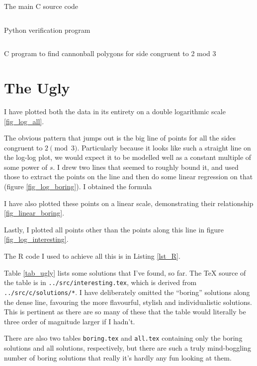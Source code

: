 \begin{longlisting}
\inputminted{c}{../src/c/cannonball.c}
\caption{The main C source code}
\label{lst_c}
\end{longlisting}

\begin{longlisting}
\inputminted{python}{../src/factcheck.py}
\caption{Python verification program}
\label{lst_py_verif}
\end{longlisting}

\begin{longlisting}
\inputminted{c}{../src/c/2mod3/2mod3.c}
\caption{C program to find cannonball polygons for side congruent to 2 mod 3}
\label{lst_c_2mod3}
\end{longlisting}

\section{The Ugly}

I have plotted both the data in its entirety on a double logarithmic scale
\ref{fig_log_all}.

The obvious pattern that jumps out is the big line of points for all the sides
congruent to \(2 \pmod 3\). Particularly because it looks like such a straight
line on the log-log plot, we would expect it to be modelled well as a constant
multiple of some power of \(s\). I drew two lines that seemed to roughly bound
it, and used those to extract the points on the line and then do some linear
regression on that (figure \ref{fig_log_boring}). I obtained the formula

I have also plotted these points on a linear scale, demonstrating their
relationship \ref{fig_linear_boring}.

Lastly, I plotted all points other than the points along this line in figure
\ref{fig_log_interesting}.

The R code I used to achieve all this is in Listing \ref{lst_R}.

Table \ref{tab_ugly} lists some solutions that I've found, so far. The \TeX{}
source of the table is in \texttt{../src/interesting.tex}, which is derived from
\texttt{../src/c/solutions/*}.  I have deliberately omitted the ``boring''
solutions along the dense line, favouring the more flavourful, stylish and
individualistic solutions. This is pertinent as there are so many of these that
the table would literally be three order of magnitude larger if I hadn't.

There are also two tables \texttt{boring.tex} and \texttt{all.tex} containing
only the boring solutions and all solutions, respectively, but there are such a
truly mind-boggling number of boring solutions that really it's hardly any fun
looking at them.

